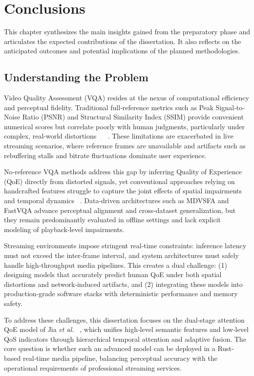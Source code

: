 \chapter{Conclusions} \label{chap:ch4}

This chapter synthesizes the main insights gained from the preparatory phase and articulates the expected contributions of the dissertation. It also reflects on the anticipated outcomes and potential implications of the planned methodologies.

\section{Understanding the Problem}

Video Quality Assessment (VQA) resides at the nexus of computational efficiency and perceptual fidelity. Traditional full‐reference metrics such as Peak Signal‐to‐Noise Ratio (PSNR) and Structural Similarity Index (SSIM) provide convenient numerical scores but correlate poorly with human judgments, particularly under complex, real‐world distortions ~\cite{huynh2012scope} ~\cite{ wang2004ssim}. These limitations are exacerbated in live streaming scenarios, where reference frames are unavailable and artifacts such as rebuffering stalls and bitrate fluctuations dominate user experience. 

No‐reference VQA methods address this gap by inferring Quality of Experience (QoE) directly from distorted signals, yet conventional approaches relying on handcrafted features struggle to capture the joint effects of spatial impairments and temporal dynamics ~\cite{min2024perceptual}. Data‐driven architectures such as MDVSFA and FastVQA advance perceptual alignment and cross‐dataset generalization, but they remain predominantly evaluated in offline settings and lack explicit modeling of playback‐level impairments.

Streaming environments impose stringent real‐time constraints: inference latency must not exceed the inter‐frame interval, and system architectures must safely handle high‐throughput media pipelines. This creates a dual challenge: (1) designing models that accurately predict human QoE under both spatial distortions and network‐induced artifacts, and (2) integrating these models into production‐grade software stacks with deterministic performance and memory safety.

To address these challenges, this dissertation focuses on the dual‐stage attention QoE model of Jia \textit{et al.} ~\cite{jia2024continuous}, which unifies high‐level semantic features and low‐level QoS indicators through hierarchical temporal attention and adaptive fusion. The core question is whether such an advanced model can be deployed in a Rust‐based real‐time media pipeline, balancing perceptual accuracy with the operational requirements of professional streaming services.  

